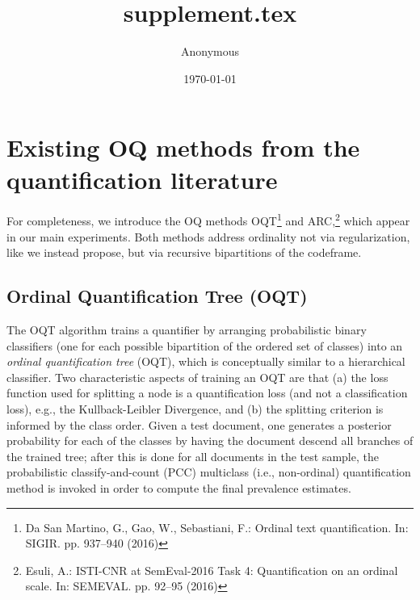 \documentclass[10pt,a4paper]{article}
\title{supplement.tex}
\author{Anonymous}
\date{\today}
\begin{document}
\section{Existing OQ methods from the quantification literature}
\label{sec:existingmethods}

\noindent For completeness, we introduce the OQ methods
OQT\footnote{Da San Martino, G., Gao, W., Sebastiani, F.: Ordinal text
quantification. In: SIGIR. pp. 937–940 (2016)}
and ARC,\footnote{Esuli, A.: ISTI-CNR at SemEval-2016 Task 4:
Quantification on an ordinal scale. In: SEMEVAL. pp. 92–95 (2016)}
which appear in our main experiments.
Both methods address ordinality not via regularization, like
we instead propose, but via recursive bipartitions of the
codeframe.



\subsection{Ordinal Quantification Tree (OQT)}
\label{sec:OQT}

\noindent The OQT algorithm 
trains a quantifier by arranging probabilistic binary classifiers (one
for each possible bipartition of the ordered set of classes) into an
\emph{ordinal quantification tree} (OQT), which is conceptually
similar to a hierarchical classifier. Two characteristic aspects of
training an OQT are that (a) the loss function used for splitting a
node is a quantification loss (and not a classification loss), e.g.,
the Kullback-Leibler Divergence, and (b) the splitting criterion is
informed by the class order. Given a test document, one generates a
posterior probability for each of the classes by having the document
descend all branches of the trained tree; after this is done for all
documents in the test sample, the probabilistic classify-and-count
(PCC) %
multiclass (i.e., non-ordinal) quantification method is invoked in
order to compute the final prevalence estimates.
\end{document}

